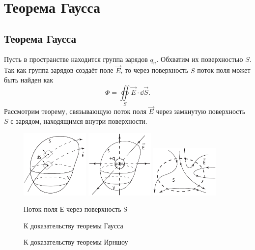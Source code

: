 \chapter{Теорема Гаусса}

\section{Теорема Гаусса}
    
    Пусть в пространстве находится группа зарядов \( q_{n} \). Обхватим их 
    поверхностью \( S \). Так как группа зарядов создаёт поле \( \vec{E} \), то 
    через поверхность \( S \) поток поля может быть найден как
    \[
        \Phi = \oiint\limits_S \vec{E}\cdot\dd\vec{S}.
    \]
    Рассмотрим теорему, связывающую поток поля \( \vec{E} \) через замкнутую 
    поверхность \( S \) с зарядом, находящимся внутри поверхности.
    
    \begin{figure}[b]
        \center
        \includegraphics[width=0.30\textwidth]{lec02/flux_E.pdf}
        \hfill
        \includegraphics[width=0.30\textwidth]{lec02/Gauss_theorem.pdf} 
        \hfill
        \includegraphics[width=0.30\textwidth]{lec02/Earnshaw_theorem.pdf}
        \parbox[t]{.3\textwidth}{
            \caption{Поток поля Е через поверхность S}
        }
        \hfill
        \parbox[t]{.3\textwidth}{
            \caption{К доказательству теоремы Гаусса}
        }
        \hfill
        \parbox[t]{.3\textwidth}{
            \caption{К доказательству теоремы Ирншоу}
        }
    \end{figure}
    

